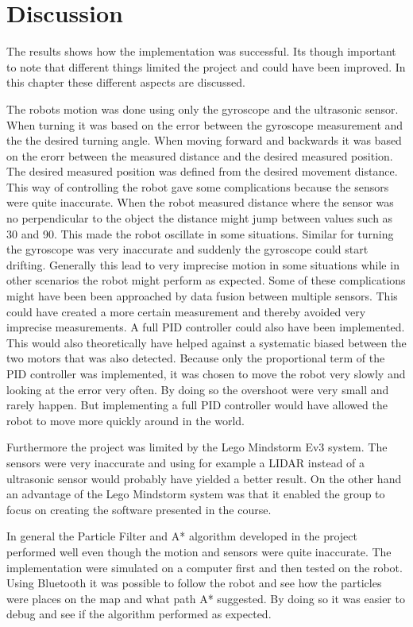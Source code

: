 \chapter{Discussion}
\label{chp:disc}
The results shows how the implementation was successful. Its though important to note that different things limited the project and could have been improved. In this chapter these different aspects are discussed.

The robots motion was done using only the gyroscope and the ultrasonic sensor. When turning it was based on the error between the gyroscope measurement and the the desired turning angle. When moving forward and backwards it was based on the erorr between the measured distance and the desired measured position. The desired measured position was defined from the desired movement distance. This way of controlling the robot gave some complications because the sensors were quite inaccurate. When the robot measured distance where the sensor was no perpendicular to the object the distance might jump between values such as 30 and 90. This made the robot oscillate in some situations. Similar for turning the gyroscope was very inaccurate and suddenly the gyroscope could start drifting. Generally this lead to very imprecise motion in some situations while in other scenarios the robot might perform as expected. Some of these complications might have been been approached by data fusion between multiple sensors. This could have created a more certain measurement and thereby avoided very imprecise measurements. A full PID controller could also have been implemented. This would also theoretically have helped against a systematic biased between the two motors that was also detected. Because only the proportional term of the PID controller was implemented, it was chosen to move the robot very slowly and looking at the error very often. By doing so the overshoot were very small and rarely happen. But implementing a full PID controller would have allowed the robot to move more quickly around in the world.

Furthermore the project was limited by the Lego Mindstorm Ev3 system. The sensors were very inaccurate and using for example a LIDAR instead of a ultrasonic sensor would probably have yielded a better result. On the other hand an advantage of the Lego Mindstorm system was that it enabled the group to focus on creating the software presented in the course.

In general the Particle Filter and A* algorithm developed in the project performed well even though the motion and sensors were quite inaccurate. The implementation were simulated on a computer first and then tested on the robot. Using Bluetooth it was possible to follow the robot and see how the particles were places on the map and what path A* suggested. By doing so it was easier to debug and see if the algorithm performed as expected.